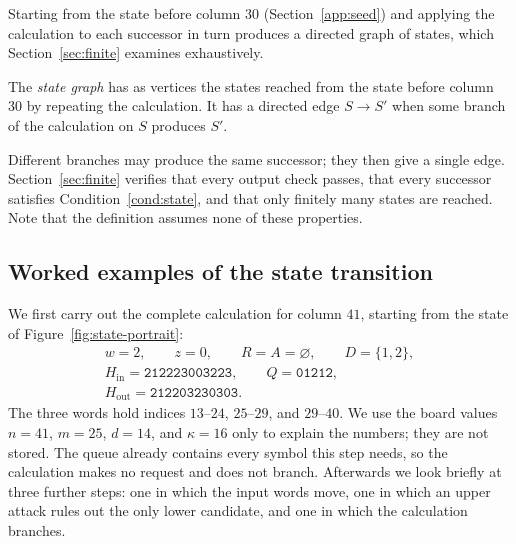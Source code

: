 Starting from the state before column $30$
(Section~\ref{app:seed}) and applying the calculation to each
successor in turn produces a directed graph of states, which
Section~\ref{sec:finite} examines exhaustively.

\begin{definition}\label{def:state-graph}
The \emph{state graph} has as vertices the
states reached from the state before column $30$ by repeating the
calculation. It has a directed edge $S\to S'$ when some branch of
the calculation on $S$ produces $S'$.
\end{definition}

Different branches may produce the same successor; they then give a
single edge. Section~\ref{sec:finite} verifies that every output
check passes, that every successor satisfies
Condition~\ref{cond:state}, and that only finitely many states are
reached. Note that the definition assumes none of these properties.

\subsection{Worked examples of the state transition}\label{sec:worked-transition}

We first carry out the complete calculation for column $41$,
starting from the state of Figure~\ref{fig:state-portrait}:
\[
 \begin{gathered}
 w=2,\qquad z=0,\qquad R=A=\varnothing,\qquad D=\{1,2\},\\
 H_{\mathrm{in}}=\mathtt{212223003223},\qquad Q=\mathtt{01212},\\
 H_{\mathrm{out}}=\mathtt{212203230303}.
 \end{gathered}
\]
The three words hold indices $13$--$24$, $25$--$29$, and $29$--$40$.
We use the board values $n=41$, $m=25$, $d=14$, and $\kappa=16$ only
to explain the numbers; they are not stored. The queue already
contains every symbol this step needs, so the calculation makes no
request and does not branch. Afterwards we look briefly at three
further steps: one in which the input words move, one in which an
upper attack rules out the only lower candidate, and one in which
the calculation branches.

